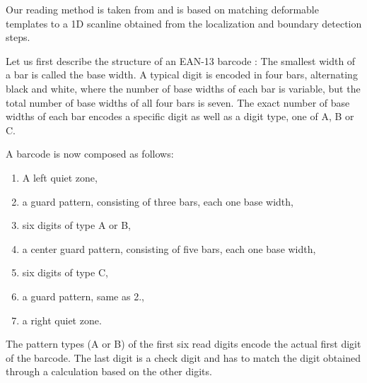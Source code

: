 

Our reading method is taken from \cite{Gallo2011} and is based on matching
deformable templates to a 1D scanline obtained from the localization and
boundary detection steps.

Let us first describe the structure of an EAN-13 barcode \cite{GS12017}:
The smallest width of a bar is called the base width. A typical digit is encoded
in four bars, alternating black and white, where the number of base widths
of each bar is variable, but the total number of base widths of all four bars is seven.
The exact number of base widths of each bar encodes a specific digit as well as a digit
type, one of A, B or C.

A barcode is now composed as follows:
\begin{enumerate}
\item A left quiet zone,
\item a guard pattern, consisting of three bars, each one base width,
\item six digits of type A or B,
\item a center guard pattern, consisting of five bars, each one base width,
\item six digits of type C,
\item a guard pattern, same as 2.,
\item a right quiet zone.
\end{enumerate}

The pattern types (A or B) of the first six read digits encode the actual first
digit of the barcode. The last digit is a check digit and has to match the digit
obtained through a calculation based on the other digits.
